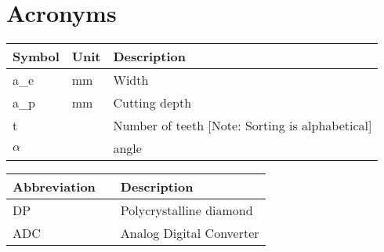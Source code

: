 
\toc %

\chapter{Acronyms} 
\newcommand{\rowheight}{3ex}
\begin{table}[ht!]
	\begin{tabularx}{\dimexpr\textwidth}{p{3cm} p{3cm} X}
		\textbf{Symbol} & \textbf{Unit} & \textbf{Description}   \\ \midrule
		a\_e                   & mm               & Width \\[\rowheight]
		a\_p                   & mm               & Cutting depth \\[\rowheight]
		t            		   &                  & Number of teeth [Note: Sorting is alphabetical] \\[\rowheight]
		$\alpha$               &                  & angle \\[\rowheight]
	\end{tabularx}
\end{table}

\begin{table}[ht!]
	\begin{tabularx}{\dimexpr\textwidth}{p{6cm}p{0cm} X}
		\textbf{Abbreviation} && \textbf{Description}   \\ \midrule
		DP                    && Polycrystalline diamond \\[\rowheight]
		ADC && Analog Digital Converter
	\end{tabularx}
\end{table}

\loflot %
